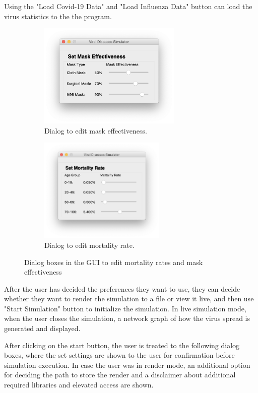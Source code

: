 \documentclass[11pt]{article}
\begin{document}
Using the "Load Covid-19 Data" and "Load Influenza Data" button can load the virus statistics to the the program. 

\begin{figure}[H]
    \centering
    \begin{subfigure}[b]{0.4\textwidth}
        \includegraphics[height=5cm]{figures/GUI-mask.png}
        \caption{Dialog to edit mask effectiveness.}
    \end{subfigure}
    \begin{subfigure}[b]{0.4\textwidth}
        \includegraphics[height=5cm]{figures/GUI-mortality.png}
        \caption{Dialog to edit mortality rate.}
    \end{subfigure}
    \caption{Dialog boxes in the GUI to edit mortality rates and mask effectiveness}
\end{figure}

After the user has decided the preferences they want to use, they can decide whether they want to render the simulation to a file or view it live, and then use "Start Simulation" button to initialize the simulation. In live simulation mode, when the user closes the simulation, a network graph of how the virus spread is generated and displayed.

After clicking on the start button, the user is treated to the following dialog boxes, where the set settings are shown to the user for confirmation before simulation execution. In case the user was in render mode, an additional option for deciding the path to store the render and a disclaimer about additional required libraries and elevated access are shown.
\end{document}
